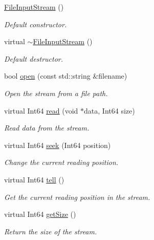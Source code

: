 \begin{DoxyCompactItemize}
\item 
\mbox{\label{classsf_1_1_file_input_stream_a9a321e273f41ff7f187899061fcae9be}} 
\hyperlink{classsf_1_1_file_input_stream_a9a321e273f41ff7f187899061fcae9be}{File\+Input\+Stream} ()
\begin{DoxyCompactList}\small\item\em Default constructor. \end{DoxyCompactList}\item 
\mbox{\label{classsf_1_1_file_input_stream_ad49ae2025ff2183f80067943a7d0276d}} 
virtual \hyperlink{classsf_1_1_file_input_stream_ad49ae2025ff2183f80067943a7d0276d}{$\sim$\+File\+Input\+Stream} ()
\begin{DoxyCompactList}\small\item\em Default destructor. \end{DoxyCompactList}\item 
bool \hyperlink{classsf_1_1_file_input_stream_a87a95dc3a71746097a99c86ee58bb353}{open} (const std\+::string \&filename)
\begin{DoxyCompactList}\small\item\em Open the stream from a file path. \end{DoxyCompactList}\item 
virtual Int64 \hyperlink{classsf_1_1_file_input_stream_ad1e94c4152429f485db224c44ee1eb50}{read} (void $\ast$data, Int64 size)
\begin{DoxyCompactList}\small\item\em Read data from the stream. \end{DoxyCompactList}\item 
virtual Int64 \hyperlink{classsf_1_1_file_input_stream_abdaf5700d4e1de07568e7829106b4eb9}{seek} (Int64 position)
\begin{DoxyCompactList}\small\item\em Change the current reading position. \end{DoxyCompactList}\item 
virtual Int64 \hyperlink{classsf_1_1_file_input_stream_a768c5fdb3be79e2d71d1bce911f8741c}{tell} ()
\begin{DoxyCompactList}\small\item\em Get the current reading position in the stream. \end{DoxyCompactList}\item 
virtual Int64 \hyperlink{classsf_1_1_file_input_stream_aabdcaa315e088e008eeb9711ecc796e8}{get\+Size} ()
\begin{DoxyCompactList}\small\item\em Return the size of the stream. \end{DoxyCompactList}\end{DoxyCompactItemize}


